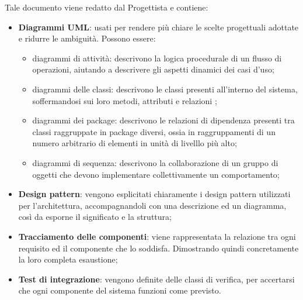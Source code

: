 	     Tale documento viene redatto dal Progettista e contiene:
	     \begin{itemize}
    	 	\item{\textbf{Diagrammi UML}}: usati per rendere più chiare le scelte progettuali adottate e ridurre le ambiguità. Possono essere:
        		\begin{itemize}
                	\item{diagrammi di attività}: descrivono la logica procedurale di un flusso di operazioni, aiutando a descrivere gli aspetti dinamici dei casi d'uso; 
	    			\item{diagrammi delle classi:} descrivono le classi presenti all'interno del sistema, soffermandosi sui loro metodi, attributi e relazioni ; 
	    			\item{diagrammi dei package}: descrivono le relazioni di dipendenza presenti tra classi raggruppate in package diversi, ossia in raggruppamenti di un numero arbitrario di elementi in unità di livelllo più alto;  			
					\item{diagrammi di sequenza}: descrivono la collaborazione di un gruppo di oggetti che devono implementare collettivamente un comportamento;                  
				\end{itemize}
				
			\item \textbf{Design pattern}: vengono esplicitati chiaramente i design pattern utilizzati per l'architettura, accompagnandoli con una descrizione ed un diagramma, così da esporne il significato e la struttura; 
			\item \textbf{Tracciamento delle componenti}: viene rappresentata la relazione tra ogni requisito ed il componente che lo soddisfa. Dimostrando quindi concretamente la loro completa esaustione;
			\item \textbf{Test di integrazione}: vengono definite delle classi di verifica, per accertarsi che ogni componente del sistema funzioni come previsto.
	     \end{itemize}
	     
